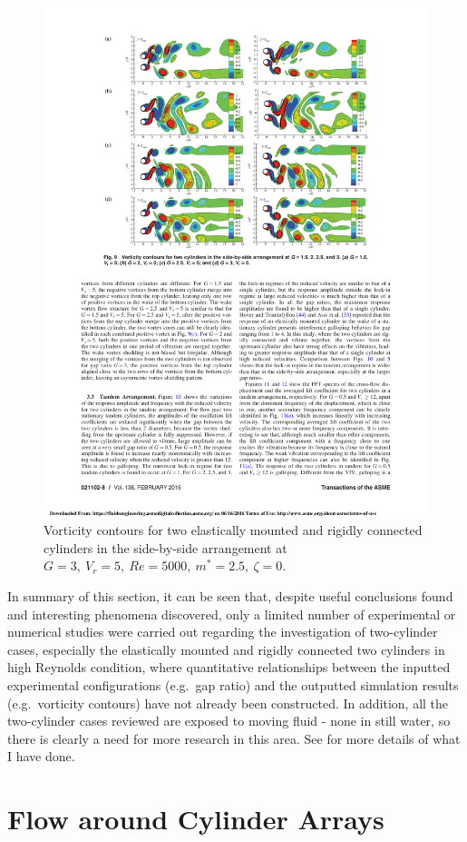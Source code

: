 \begin{figure}[tbp]
\centering
	\captionsetup{justification=centering}
\includegraphics[width=0.7\linewidth]{Figs/2casymetricpat}
\caption{Vorticity contours for two elastically mounted and rigidly connected cylinders in the side-by-side arrangement at $ G=3,\ V_r=5,\ Re=5000,\ m^*=2.5,\ \zeta=0 $. \cite{zhao2016numerical}}
\label{fig:2casymetricpat}
\end{figure}


In summary of this section, it can be seen that, despite useful conclusions found and interesting phenomena discovered, only a limited number of experimental or numerical studies were carried out regarding the investigation of two-cylinder cases, especially the elastically mounted and rigidly connected two cylinders in high Reynolds condition, where quantitative relationships between the inputted experimental configurations (e.g.\ gap ratio) and the outputted simulation results (e.g.\ vorticity contours) have not already been constructed. In addition, all the two-cylinder cases reviewed are exposed to moving fluid - none in still water, so there is clearly a need for more research in this area. See  for more details of what I have done.

\section{Flow around Cylinder Arrays} \label{sec:fa>2}

